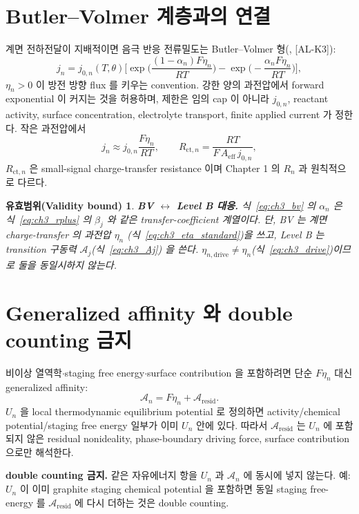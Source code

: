 \documentclass[11pt,a4paper]{article}
\newtheorem*{boundbox}{유효범위(Validity bound)}
\newcommand{\eff}{\mathrm{eff}}
\newcommand{\drive}{\mathrm{drive}}
\newcommand{\ct}{\mathrm{ct}}
\newcommand{\resid}{\mathrm{resid}}
\newcommand{\AL}[1]{\textsf{[AL-#1]}}
\begin{document}
\section{Butler--Volmer 계층과의 연결}\label{sec:ch3_bv}
계면 전하전달이 지배적이면 음극 반응 전류밀도는 Butler--Volmer 형(\cite{bardfaulkner,newman2004}, \AL{K3}):
\begin{equation}
j_n=j_{0,n}(T,\theta)\Big[\exp\!\Big(\frac{(1-\alpha_n)F\eta_n}{RT}\Big)-\exp\!\Big(-\frac{\alpha_n F\eta_n}{RT}\Big)\Big],
\label{eq:ch3_bv}
\end{equation}
$\eta_n>0$ 이 방전 방향 flux 를 키우는 convention. 강한 양의 과전압에서 forward exponential 이 커지는 것을
허용하며, 제한은 임의 cap 이 아니라 $j_{0,n}$, reactant activity, surface concentration, electrolyte
transport, finite applied current 가 정한다. 작은 과전압에서
\begin{equation}
j_n\approx j_{0,n}\frac{F\eta_n}{RT},\qquad
R_{\ct,n}=\frac{RT}{F\,A_{\eff}\,j_{0,n}},
\label{eq:ch3_rct}
\end{equation}
$R_{\ct,n}$ 은 small-signal charge-transfer resistance 이며 Chapter 1 의 $R_n$ 과 원칙적으로 다르다.
\begin{boundbox}
\textbf{BV $\leftrightarrow$ Level B 대응.} 식~\eqref{eq:ch3_bv} 의 $\alpha_n$ 은 식~\eqref{eq:ch3_rplus}
의 $\beta_j$ 와 같은 transfer-coefficient 계열이다. 단, BV 는 \emph{계면 charge-transfer} 의 과전압 $\eta_n$
(식~\eqref{eq:ch3_eta_standard})을 쓰고, Level B 는 \emph{transition} 구동력 $\mathcal A_j$(식~\eqref{eq:ch3_Aj})
을 쓴다. $\eta_{n,\drive}\ne\eta_n$(식~\eqref{eq:ch3_drive})이므로 둘을 동일시하지 않는다.
\end{boundbox}

\section{Generalized affinity 와 double counting 금지}\label{sec:ch3_genaff}
비이상 열역학$\cdot$staging free energy$\cdot$surface contribution 을 포함하려면 단순 $F\eta_n$ 대신
generalized affinity:
\begin{equation}
\mathcal A_n=F\eta_n+\mathcal A_{\resid}.
\label{eq:ch3_genaff}
\end{equation}
$U_n$ 을 local thermodynamic equilibrium potential 로 정의하면 activity/chemical potential/staging free
energy 일부가 이미 $U_n$ 안에 있다. 따라서 $\mathcal A_{\resid}$ 는 $U_n$ 에 포함되지 않은 residual
nonideality, phase-boundary driving force, surface contribution 으로만 해석한다.
\begin{mdframed}
\textbf{double counting 금지.} 같은 자유에너지 항을 $U_n$ 과 $\mathcal A_n$ 에 동시에 넣지 않는다. 예: $U_n$ 이
이미 graphite staging chemical potential 을 포함하면 동일 staging free-energy 를 $\mathcal A_{\resid}$ 에
다시 더하는 것은 double counting.
\end{mdframed}
\end{document}
